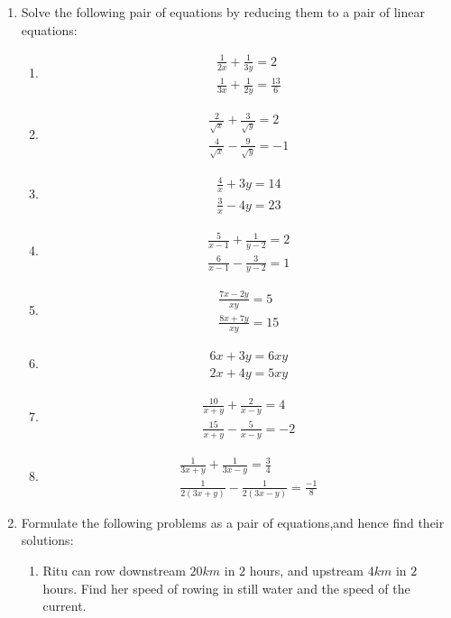 \begin{enumerate}
\item Solve the following pair of equations by reducing them to a pair of linear equations:
\begin{enumerate}[label=(\roman*)]
\item
\begin{align}
\frac{1}{2x}+\frac{1}{3y}=2 \\ \frac{1}{3x}+\frac{1}{2y}=\frac{13}{6}
\end{align}
\item
\begin{align}
\frac{2}{\sqrt{x}}+\frac{3}{\sqrt{y}}=2\\
\frac{4}{\sqrt{x}}-\frac{9}{\sqrt{y}}=-1
\end{align}
\item
\begin{align}
\frac{4}{x}+3y=14\\ \frac{3}{x}-4y=23
\end{align}
\item
\begin{align}
\frac{5}{x-1}+\frac{1}{y-2}=2\\ \frac{6}{x-1}-\frac{3}{y-2}=1
\end{align}
\item
\begin{align}
\frac{7x-2y}{xy}=5\\ \frac{8x+7y}{xy}=15
\end{align}
\item
\begin{align}
6x+3y=6xy\\ 2x+4y=5xy
\end{align}
\item
\begin{align}
\frac{10}{x+y}+\frac{2}{x-y}=4\\ \frac{15}{x+y}-\frac{5}{x-y}=-2
\end{align}
\item
\begin{align}
\frac{1}{3x+y}+\frac{1}{3x-y}=\frac{3}{4}\\ \frac{1}{2(3x+y)}-\frac{1}{2(3x-y)}=\frac{-1}{8}
\end{align}
\end{enumerate}
\item Formulate the following problems as a pair of equations,and hence find their solutions:
\begin{enumerate}[label=(\roman*)]
\item Ritu can row downstream $20km$ in $2$ hours, and upstream $4km$ in $2$ hours. Find her speed of rowing in still water and the speed of the current.

\end{enumerate}
\end{enumerate}
